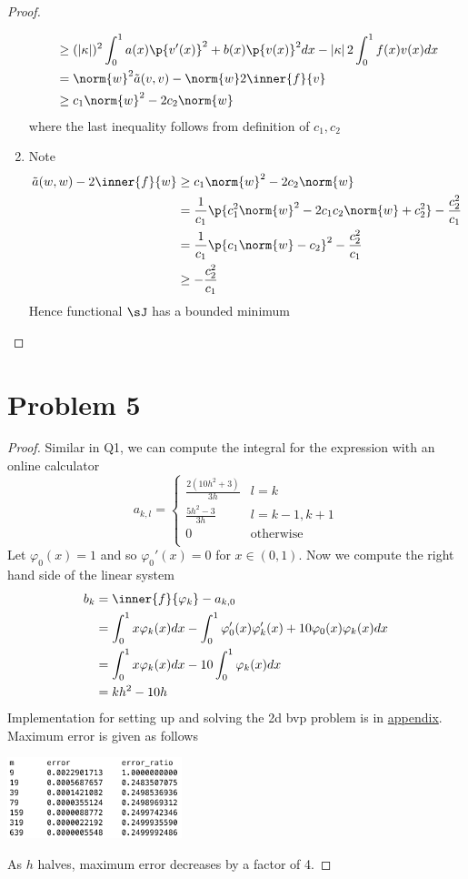 \documentclass[11pt]{article}
\begin{document}
\begin{proof}
\begin{enumerate}
\begin{align*}
        &\geq (\abs{\kappa})^2 \int_0^1 a(x) \p{v'(x)}^2 + b(x) \p{v(x)}^2 dx - \abs{\kappa} 2\int_0^1 f(x) v(x) dx \\
        &= \norm{w}^2 \ta(v,v) - \norm{w} 2\inner{f}{v} \\
        &\geq c_1 \norm{w}^2 -2c_2 \norm{w}
    \end{align*}
    where the last inequality follows from definition of $c_1,c_2$
    \item Note 
    \begin{align*}
        \ta(w,w) - 2\inner{f}{w}
        &\geq  c_1 \norm{w}^2 -2c_2 \norm{w} \\
        &= \frac{1}{c_1} \p{
            c_1^2 \norm{w}^2 - 2c_1 c_2 \norm{w} + c_2^2
        } - \frac{c_2^2}{c_1} \\
        &= \frac{1}{c_1} \p{
            c_1 \norm{w} - c_2
        }^2 - \frac{c_2^2}{c_1} \\
        &\geq -\frac{c_2^2}{c_1}
    \end{align*}
    Hence functional $\sJ$ has a bounded minimum
\end{enumerate}
\end{proof}


\newpage
\section*{Problem 5}
\begin{proof}
    Similar in Q1, we can compute the integral for the expression with an online calculator
    \[
        a_{k,l} = 
        \begin{cases}
            \frac{2(10h^2 + 3)}{3h} & l=k \\
            \frac{5h^2 -  3}{3h} & l=k-1,k+1 \\
            0 & \text{otherwise} \\
        \end{cases}  
    \]
    Let $\varphi_0(x) = 1$ and so $\varphi_0'(x) = 0$ for $x\in (0,1)$. Now we compute the right hand side of the linear system
    \begin{align*}
        b_k
        &= \inner{f}{\varphi_k} - a_{k,0} \\
        &= \int_0^1 x \varphi_k(x) dx - \int_0^1 \varphi_0'(x) \varphi_k'(x) + 10 \varphi_0(x) \varphi_k(x) dx \\
        &= \int_0^1 x \varphi_k(x) dx - 10 \int_0^1 \varphi_k(x) dx \\
        &= kh^2 - 10h
    \end{align*}
    Implementation for setting up and solving the 2d bvp problem is in \hyperref[q5code]{appendix}. Maximum error is given as follows
    \begin{center}
        \includegraphics[width=2in]{q5out}
    \end{center}
    As $h$ halves, maximum error decreases by a factor of 4.
\end{proof}
\end{document}
